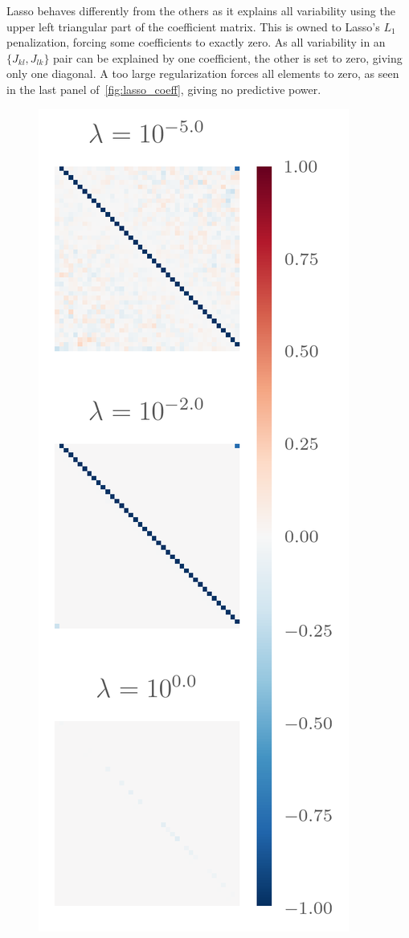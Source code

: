 Lasso behaves differently from the others as it explains all variability using
the upper left triangular part of the coefficient matrix. This is owned to
Lasso's \(L_{1}\) penalization, forcing some coefficients to exactly zero. As
all variability in an \(\{J_{kl}, J_{lk}\}\) pair can be explained by one
coefficient, the other is set to zero, giving only one diagonal. A too large
regularization forces all elements to zero, as seen in the last panel
of~\cref{fig:lasso_coeff},  giving no predictive power.

\begin{figure}[H]
  \centering
  \includegraphics[]{figures/lasso_coeff.png}

\end{figure}
